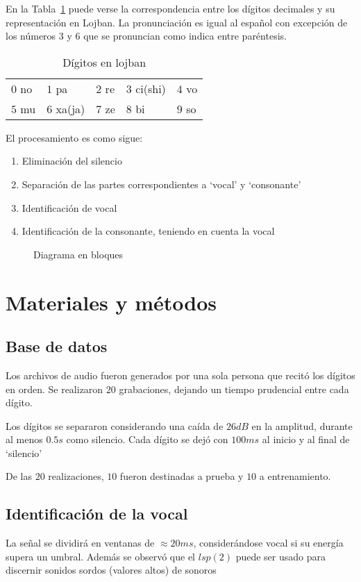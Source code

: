 \documentclass[conference,a4paper,10pt,oneside,final]{tfmpd}
\begin{document}
	En la Tabla~\ref{tab:digitos} puede verse la correspondencia entre los dígitos decimales
	y su representación en Lojban. La pronunciación es igual al español
	con excepción de los números $3$ y $6$ que se pronuncian como indica
	entre paréntesis.

	\begin{table}[h]
		\center
		\begin{tabular}{lllll}
			$0$ no & $1$ pa & $2$ re & $3$ ci(shi) & $4$ vo\\
			$5$ mu & $6$ xa(ja) & $7$ ze & $8$ bi & $9$ so\\
		\end{tabular}
		\caption{Dígitos en lojban}
		\label{tab:digitos}
	\end{table}


   	 El procesamiento es como sigue:
   	 \begin{enumerate}
   		 \item Eliminación del silencio
   		 \item Separación de las partes correspondientes a `vocal' y `consonante'
   		 \item Identificación de vocal
   		 \item Identificación de la consonante, teniendo en cuenta la vocal
   	 \end{enumerate}
	 \begin{figure}
		\resizebox{0.5\textwidth}{!}{
			
		}
		\caption{Diagrama en bloques}
	 \end{figure}
	

\section{Materiales y métodos}
	\subsection{Base de datos}
		Los archivos de audio fueron generados por una sola persona que recitó los dígitos en orden.
		Se realizaron $20$ grabaciones, dejando un tiempo prudencial entre cada dígito.

		Los dígitos se separaron considerando una caída de $26dB$ en la amplitud, durante al menos
		$0.5s$ como silencio. Cada dígito se dejó con $100ms$ al inicio y al final de `silencio'

		De las $20$ realizaciones, $10$ fueron destinadas a prueba y $10$ a entrenamiento.


	\subsection{Identificación de la vocal}
		La señal se dividirá en ventanas de $\approx 20ms$, considerándose vocal si 
		su energía supera un umbral. 
		Además se observó que el $lsp(2)$ puede ser usado para discernir sonidos sordos (valores altos) 
		de sonoros
\end{document}
